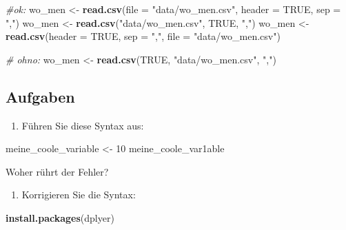 \documentclass[12pt,ngerman,]{book}
\makeatletter
\newenvironment{Shaded}{\begin{snugshade}}{\end{snugshade}}
\newcommand{\KeywordTok}[1]{\textcolor[rgb]{0.13,0.29,0.53}{\textbf{{#1}}}}
\newcommand{\DataTypeTok}[1]{\textcolor[rgb]{0.13,0.29,0.53}{{#1}}}
\newcommand{\DecValTok}[1]{\textcolor[rgb]{0.00,0.00,0.81}{{#1}}}
\newcommand{\StringTok}[1]{\textcolor[rgb]{0.31,0.60,0.02}{{#1}}}
\newcommand{\CommentTok}[1]{\textcolor[rgb]{0.56,0.35,0.01}{\textit{{#1}}}}
\newcommand{\OtherTok}[1]{\textcolor[rgb]{0.56,0.35,0.01}{{#1}}}
\newcommand{\NormalTok}[1]{{#1}}
\providecommand{\tightlist}{%
  \setlength{\itemsep}{0pt}\setlength{\parskip}{0pt}}
\newenvironment{kframe}{%
\medskip{}
\setlength{\fboxsep}{.8em}
 \def\at@end@of@kframe{}%
 \ifinner\ifhmode%
  \def\at@end@of@kframe{\end{minipage}}%
  \begin{minipage}{\columnwidth}%
 \fi\fi%
 \def\FrameCommand##1{\hskip\@totalleftmargin \hskip-\fboxsep
 \colorbox{shadecolor}{##1}\hskip-\fboxsep
     \hskip-\linewidth \hskip-\@totalleftmargin \hskip\columnwidth}%
 \MakeFramed {\advance\hsize-\width
   \@totalleftmargin\z@ \linewidth\hsize
   \@setminipage}}%
 {\par\unskip\endMakeFramed%
 \at@end@of@kframe}
\renewenvironment{Shaded}{\begin{kframe}}{\end{kframe}}
\makeatother
\begin{document}
\begin{Shaded}
\begin{Highlighting}[]
\CommentTok{#ok:}
\NormalTok{wo_men <-}\StringTok{ }\KeywordTok{read.csv}\NormalTok{(}\DataTypeTok{file =} \StringTok{"data/wo_men.csv"}\NormalTok{, }\DataTypeTok{header =} \OtherTok{TRUE}\NormalTok{, }\DataTypeTok{sep =} \StringTok{","}\NormalTok{)}
\NormalTok{wo_men <-}\StringTok{ }\KeywordTok{read.csv}\NormalTok{(}\StringTok{"data/wo_men.csv"}\NormalTok{, }\OtherTok{TRUE}\NormalTok{, }\StringTok{","}\NormalTok{)}
\NormalTok{wo_men <-}\StringTok{ }\KeywordTok{read.csv}\NormalTok{(}\DataTypeTok{header =} \OtherTok{TRUE}\NormalTok{, }\DataTypeTok{sep =} \StringTok{","}\NormalTok{, }\DataTypeTok{file =} \StringTok{"data/wo_men.csv"}\NormalTok{)}


\CommentTok{# ohno:}
\NormalTok{wo_men <-}\StringTok{ }\KeywordTok{read.csv}\NormalTok{(}\OtherTok{TRUE}\NormalTok{, }\StringTok{"data/wo_men.csv"}\NormalTok{, }\StringTok{","}\NormalTok{)}
\end{Highlighting}
\end{Shaded}

\subsection{Aufgaben}\label{aufgaben-1}

\begin{enumerate}
\def\labelenumi{\arabic{enumi}.}
\setcounter{enumi}{2}
\tightlist
\item
  Führen Sie diese Syntax aus:
\end{enumerate}

\begin{Shaded}
\begin{Highlighting}[]
\NormalTok{meine_coole_variable <-}\StringTok{ }\DecValTok{10}
\NormalTok{meine_coole_var1able }
\end{Highlighting}
\end{Shaded}

Woher rührt der Fehler?

\begin{enumerate}
\def\labelenumi{\arabic{enumi}.}
\setcounter{enumi}{3}
\tightlist
\item
  Korrigieren Sie die Syntax:
\end{enumerate}

\begin{Shaded}
\begin{Highlighting}[]
\KeywordTok{install.packages}\NormalTok{(dplyer)}
\end{Highlighting}
\end{Shaded}
\end{document}
